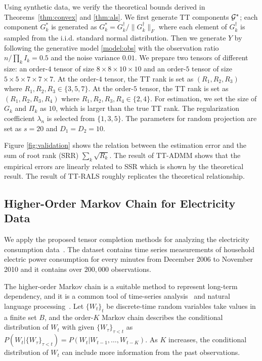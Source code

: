 Using synthetic data, we verify the theoretical bounds derived in
Theorems~\ref{thm:convex} and \ref{thm:als}.  We first generate TT
components $\mathcal{G}^*$; each component $G_k^*$ is generated as
$G_k^* = G_k^{\dagger} / \|G_k^{\dagger}\|_F$ where each element of
$G_k^{\dagger}$ is sampled from the i.i.d.  standard normal
distribution. Then we generate $Y$ by following the generative model
\eqref{model:obs} with the observation ratio $n/\prod_k I_k = 0.5$ and
the noise variance $0.01$.
%
We prepare two tensors of different size: an order-$4$ tensor of size
$8\times 8\times 10\times 10$ and an order-$5$ tensor of size
$5\times 5\times 7\times 7\times 7$.  At the order-$4$ tensor, the TT
rank is set as $(R_1,R_2,R_3)$ where $R_1,R_2,R_3 \in \{3,5,7\}$.  At
the order-$5$ tensor, the TT rank is set as $(R_1,R_2,R_3,R_4)$ where
$R_1,R_2,R_3,R_4 \in \{2,4\}$.  For estimation, we set the size of
$G_k$ and $\Pi_k$ as $10$, which is larger than the true TT rank.  The
regularization coefficient $\lambda_n$ is selected from $\{1,3,5\}$.
The parameters for random projection are set as $s = 20$ and $D_1=D_2=10$.

Figure \ref{fig:validation} shows the relation between the estimation
error and the sum of root rank (SRR) $\sum_k \sqrt{R_k}$.  The result of TT-ADMM shows that 
the empirical errors are linearly related to SSR which is shown by the theoretical result.
The result of TT-RALS roughly replicates the theoretical relationship.


\subsection{Higher-Order Markov Chain for Electricity Data}

We apply the proposed tensor completion methods for analyzing the
electricity consumption data~\cite{Lichman:2013}.  The dataset
contains time series measurements of household electric power
consumption for every minutes from December 2006 to November 2010 and
it contains over $200,000$ observations.

The higher-order Markov chain is a suitable method to represent
long-term dependency, and it is a common tool of time-series
analysis~\cite{hamilton1994time} and natural language
processing~\cite{jurafsky2014speech}.  Let $\{W_t\}_{t}$ be
discrete-time random variables take values in a finite set $B$, and
the order-$K$ Markov chain describes the conditional distribution of
$W_t$ with given $\{W_{\tau}\}_{\tau < t}$ as
$P(W_t | \{W_{\tau}\}_{\tau < t}) = P(W_t | W_{t-1}, \ldots,
W_{t-K})$.
As $K$ increases, the conditional distribution of $W_t$ can include
more information from the past observations.

